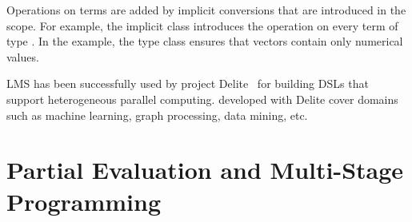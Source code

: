 Operations on  terms are added by implicit conversions that are introduced in the \edsl scope. For example, the implicit class  introduces the \code{+} operation on every term of type . In the example, the type class  ensures that vectors contain only numerical values.

LMS has been successfully used by project Delite~\cite{brown_heterogeneous_2011,composition-ecoop2013} for building DSLs that support heterogeneous parallel computing. \edsls developed with Delite cover domains
such as machine learning, graph processing, data mining, etc.

\section{Partial Evaluation and Multi-Stage Programming}
\label{sec:partial-evaluation}
